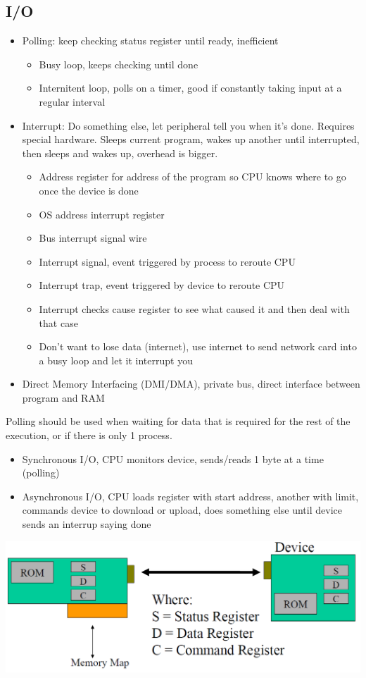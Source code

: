 \documentclass[12 pt]{article}
\begin{document}
\subsection{I/O}
\begin{itemize}
\item Polling: keep checking status register until ready, inefficient
\begin{itemize}
\item Busy loop, keeps checking until done
\item Internitent loop, polls on a timer, good if constantly taking input at a regular interval
\end{itemize}
\item Interrupt: Do something else, let peripheral tell you when it's done. Requires special hardware. Sleeps current program, wakes up another until interrupted, then sleeps and wakes up, overhead is bigger.
\begin{itemize}
\item Address register for address of the program so CPU knows where to go once the device is done
\item OS address interrupt register
\item Bus interrupt signal wire
\item Interrupt signal, event triggered by process to reroute CPU
\item Interrupt trap, event triggered by device to reroute CPU
\item Interrupt checks cause register to see what caused it and then deal with that case
\item Don't want to lose data (internet), use internet to send network card into a busy loop and let it interrupt you
\end{itemize}
\item Direct Memory Interfacing (DMI/DMA), private bus, direct interface between program and RAM
\end{itemize}
Polling should be used when waiting for data that is required for the rest of the execution, or if there is only 1 process.
\begin{itemize}
\item Synchronous I/O, CPU monitors device, sends/reads 1 byte at a time (polling)
\item Asynchronous I/O, CPU loads register with start address, another with limit, commands device to download or upload, does something else until device sends an interrup saying done
\end{itemize}
\includegraphics[scale=0.7]{sdc}
\end{document}
